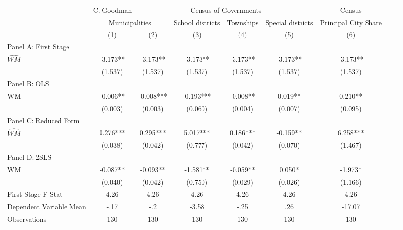  \begin{tabular}{l*{8}{c}} \toprule
&\multicolumn{1}{c}{C. Goodman}&\multicolumn{4}{c}{Census of Governments}&\multicolumn{1}{c}{Census}\\\cmidrule(lr){2-2}\cmidrule(lr){3-6}\cmidrule(lr){7-7}
&\multicolumn{2}{c}{Municipalities}&\multicolumn{1}{c}{School districts}&\multicolumn{1}{c}{Townships}&\multicolumn{1}{c}{Special districts}&\multicolumn{1}{c}{Principal City Share}\\\cmidrule(lr){2-3}\cmidrule(lr){4-6}\cmidrule(lr){7-7}
&\multicolumn{1}{c}{(1)}&\multicolumn{1}{c}{(2)}&\multicolumn{1}{c}{(3)}&\multicolumn{1}{c}{(4)}&\multicolumn{1}{c}{(5)}&\multicolumn{1}{c}{(6)}\\
\cmidrule(lr){1-7}
\multicolumn{6}{l}{Panel A: First Stage}\\
\cmidrule(lr){1-7}
$\widehat{WM}$  &   -3.173** &   -3.173** &   -3.173** &   -3.173** &   -3.173** &   -3.173** \\
                &  (1.537)   &  (1.537)   &  (1.537)   &  (1.537)   &  (1.537)   &  (1.537)   \\
\cmidrule(lr){1-7}
\multicolumn{6}{l}{Panel B: OLS}\\
\cmidrule(lr){1-7}
WM              &   -0.006** &   -0.008***&   -0.193***&   -0.008** &    0.019** &    0.210** \\
                &  (0.003)   &  (0.003)   &  (0.060)   &  (0.004)   &  (0.007)   &  (0.095)   \\
\cmidrule(lr){1-7}
\multicolumn{6}{l}{Panel C: Reduced Form}\\
\cmidrule(lr){1-7}
$\widehat{WM}$  &    0.276***&    0.295***&    5.017***&    0.186***&   -0.159** &    6.258***\\
                &  (0.038)   &  (0.042)   &  (0.777)   &  (0.042)   &  (0.070)   &  (1.467)   \\
\cmidrule(lr){1-7}
\multicolumn{6}{l}{Panel D: 2SLS}\\
\cmidrule(lr){1-7}
WM              &   -0.087** &   -0.093** &   -1.581** &   -0.059** &    0.050*  &   -1.973*  \\
                &  (0.040)   &  (0.042)   &  (0.750)   &  (0.029)   &  (0.026)   &  (1.166)   \\
\midrule
First Stage F-Stat&     4.26   &     4.26   &     4.26   &     4.26   &     4.26   &     4.26   \\
Dependent Variable Mean&     -.17   &      -.2   &    -3.58   &     -.25   &      .26   &   -17.07   \\
Observations    &      130   &      130   &      130   &      130   &      130   &      130   \\
       \bottomrule \end{tabular}
